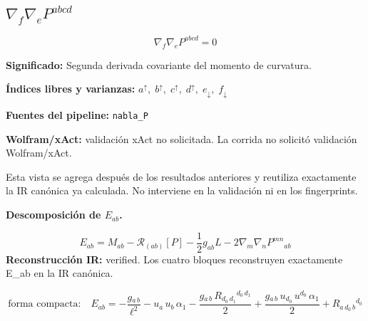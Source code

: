 \documentclass[11pt]{article}
\begin{document}
\subsection*{$ \nabla_f\nabla_e P^{abcd} $}
\begin{dmath*}[breakdepth={5}]
\nabla_f\nabla_e P^{abcd} = 0
\end{dmath*}
\par\vspace{1.2\baselineskip}\noindent
\begin{minipage}{\linewidth}
\textbf{Significado:} Segunda derivada covariante del momento de curvatura.\par
\textbf{Índices libres y varianzas:} $ a^{\uparrow},\;b^{\uparrow},\;c^{\uparrow},\;d^{\uparrow},\;e_{\downarrow},\;f_{\downarrow} $\par
\textbf{Fuentes del pipeline:} \texttt{nabla\_P}\par
\textbf{Wolfram/xAct:} validación xAct no solicitada. La corrida no solicitó validación Wolfram/xAct.\par
\end{minipage}
\par\bigskip{}\par
Esta vista se agrega después de los resultados anteriores y reutiliza exactamente la IR canónica ya calculada. No interviene en la validación ni en los fingerprints.\par
{}
\par\medskip\noindent\textbf{Descomposición de $ E_{ab} $.}\par
\begin{dmath*}[breakdepth={5}]
E_{ab}=M_{ab}-\mathcal{R}_{(ab)}[P]-\frac{1}{2}g_{ab}L-2\nabla_m\nabla_nP^{mn}{}_{ab}
\end{dmath*}
\textbf{Reconstrucción IR:} verified. Los cuatro bloques reconstruyen exactamente E\_ab en la IR canónica.\par
\begin{dmath*}[breakdepth={5}]
\text{forma compacta:}\quad E_{ab} = -\frac{g{}_{a\,b}}{{\ell}^{2}} - u{}_{a}\,u{}_{b}\,\alpha_{1} - \frac{g{}_{a\,b}\,R{}_{d_{0}\,d_{1}}{}^{d_{0}\,d_{1}}}{2} + \frac{g{}_{a\,b}\,u{}_{d_{0}}\,u{}^{d_{0}}\,\alpha_{1}}{2} + R{}_{a\,d_{0}\,b}{}^{d_{0}}
\end{dmath*}
\end{document}
